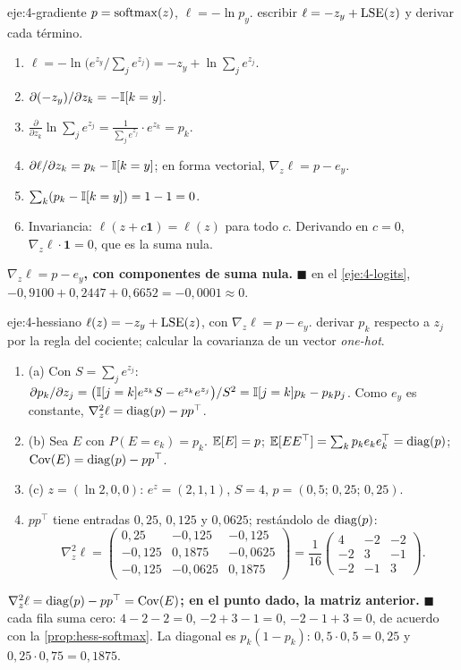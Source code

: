 \begin{solucion}{eje:4-gradiente}
\datos $p=\operatorname{softmax}(z)$, $\ell=-\ln p_y$.
\planteamiento escribir $\ell=-z_y+\operatorname{LSE}(z)$ y derivar cada término.
\pasos
\begin{enumerate}[label=\arabic*.]
  \item $\ell=-\ln\bigl(e^{z_y}/\sum_je^{z_j}\bigr)=-z_y+\ln\sum_je^{z_j}$.
  \item $\partial(-z_y)/\partial z_k=-\mathbb{I}[k=y]$.
  \item $\frac{\partial}{\partial z_k}\ln\sum_je^{z_j}=\frac{1}{\sum_je^{z_j}}\cdot e^{z_k}=p_k$.
  \item $\partial\ell/\partial z_k=p_k-\mathbb{I}[k=y]$; en forma vectorial, $\nabla_z\ell=p-e_y$.
  \item $\sum_k(p_k-\mathbb{I}[k=y])=1-1=0$.
  \item Invariancia: $\ell(z+c\mathbf{1})=\ell(z)$ para todo $c$. Derivando en $c=0$, $\nabla_z\ell\cdot\mathbf{1}=0$, que es la suma nula.
\end{enumerate}
\resultado \textbf{$\nabla_z\ell=p-e_y$, con componentes de suma nula.} $\blacksquare$
\comprobacion en el \cref{eje:4-logits}, $-0{,}9100+0{,}2447+0{,}6652=-0{,}0001\approx 0$.
\end{solucion}

\begin{solucion}{eje:4-hessiano}
\datos $\ell(z)=-z_y+\operatorname{LSE}(z)$, con $\nabla_z\ell=p-e_y$.
\planteamiento derivar $p_k$ respecto a $z_j$ por la regla del cociente; calcular la covarianza de un vector \emph{one-hot}.
\pasos
\begin{enumerate}[label=\arabic*.]
  \item (a) Con $S=\sum_je^{z_j}$: $\partial p_k/\partial z_j=\bigl(\mathbb{I}[j=k]e^{z_k}S-e^{z_k}e^{z_j}\bigr)/S^{2}=\mathbb{I}[j=k]p_k-p_kp_j$. Como $e_y$ es constante, $\nabla^{2}_z\ell=\operatorname{diag}(p)-pp^{\top}$.
  \item (b) Sea $E$ con $P(E=e_k)=p_k$. $\mathbb{E}[E]=p$; $\mathbb{E}[EE^{\top}]=\sum_kp_ke_ke_k^{\top}=\operatorname{diag}(p)$; $\operatorname{Cov}(E)=\operatorname{diag}(p)-pp^{\top}$.
  \item (c) $z=(\ln 2,0,0)$: $e^{z}=(2,1,1)$, $S=4$, $p=(0{,}5;\,0{,}25;\,0{,}25)$.
  \item $pp^{\top}$ tiene entradas $0{,}25$, $0{,}125$ y $0{,}0625$; restándolo de $\operatorname{diag}(p)$:
  \[
  \nabla_z^{2}\ell=\begin{pmatrix}0{,}25&-0{,}125&-0{,}125\\-0{,}125&0{,}1875&-0{,}0625\\-0{,}125&-0{,}0625&0{,}1875\end{pmatrix}=\frac{1}{16}\begin{pmatrix}4&-2&-2\\-2&3&-1\\-2&-1&3\end{pmatrix}.
  \]
\end{enumerate}
\resultado \textbf{$\nabla_z^{2}\ell=\operatorname{diag}(p)-pp^{\top}=\operatorname{Cov}(E)$; en el punto dado, la matriz anterior.} $\blacksquare$
\comprobacion cada fila suma cero: $4-2-2=0$, $-2+3-1=0$, $-2-1+3=0$, de acuerdo con la \cref{prop:hess-softmax}. La diagonal es $p_k(1-p_k)$: $0{,}5\cdot 0{,}5=0{,}25$ y $0{,}25\cdot 0{,}75=0{,}1875$.
\end{solucion}

